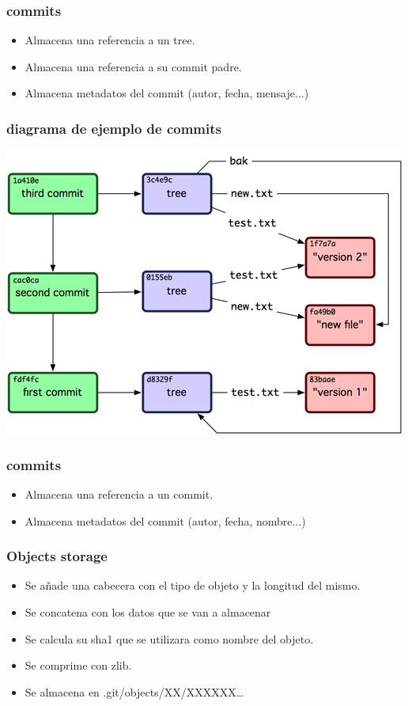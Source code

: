 \documentclass[10pt]{beamer}
\begin{document}
  \begin{frame}
    \frametitle{commits}
    \begin{itemize}
        \item Almacena una referencia a un tree.
        \item Almacena una referencia a su commit padre.
        \item Almacena metadatos del commit (autor, fecha, mensaje...)
    \end{itemize}
  \end{frame}

  \begin{frame}
    \frametitle{diagrama de ejemplo de commits}
    \begin{center}\includegraphics{commits.png}\end{center}
  \end{frame}

  \begin{frame}
    \frametitle{commits}
    \begin{itemize}
        \item Almacena una referencia a un commit.
        \item Almacena metadatos del commit (autor, fecha, nombre...)
    \end{itemize}
  \end{frame}


  \begin{frame}
    \frametitle{Objects storage}
    \begin{itemize}
        \item Se añade una cabecera con el tipo de objeto y la longitud del mismo.
        \item Se concatena con los datos que se van a almacenar
        \item Se calcula su sha1 que se utilizara como nombre del objeto.
        \item Se comprime con zlib.
        \item Se almacena en .git/objects/XX/XXXXXX\dots{}
    \end{itemize}
  \end{frame}
\end{document}
